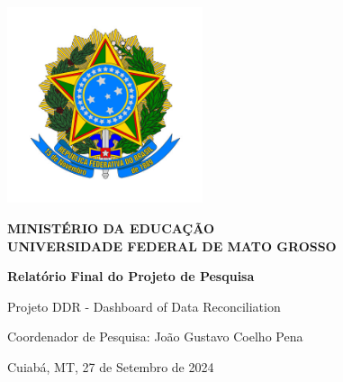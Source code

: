 \begin{titlepage}

\begin{center}

\small

\begin{center}
\includegraphics[width=5.75cm]{pre-textuais/figuras/brasao-republica.jpeg}    
\end{center}

\LARGE{\textbf{MINISTÉRIO DA EDUCAÇÃO\\
UNIVERSIDADE FEDERAL DE MATO GROSSO\\}}

\vfill

\LARGE

\textbf{Relatório Final do Projeto de Pesquisa}

\vfill

\Large

Projeto DDR - Dashboard of Data Reconciliation

\vfill

\large

Coordenador de Pesquisa: João Gustavo Coelho Pena

\vfill

\large

Cuiabá, MT, 27 de Setembro de 2024

\end{center}

\end{titlepage}
